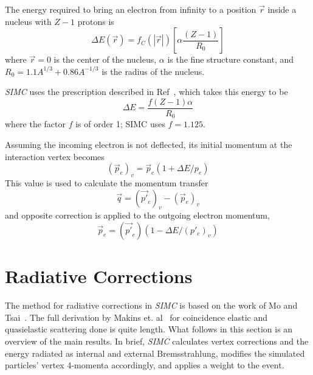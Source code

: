 The energy required to bring an electron from infinity to a position $\vec{r}$
inside a nucleus with $Z-1$ protons is
\begin{equation}
    \Delta E(\vec{r})=f_{C}(|\vec{r}|)\left[\alpha \frac{(Z-1)}{R_{0}}\right]
\end{equation}
where
$\vec{r}=0$ is the center of the nucleus,
$\alpha$ is the fine structure constant,
and
$R_0=1.1 A^{1/3}+0.86 A^{-1/3}$ is the radius of the nucleus.


\textit{SIMC} uses the prescription described in Ref~\cite{Aste_2005}, which
takes this energy to be
\begin{equation}
    \Delta E = \frac{f(Z-1)\alpha}{R_0}
\end{equation}
where the factor $f$ is of order 1; SIMC uses $f=1.125$.


Assuming the incoming electron is not deflected, its initial momentum at the
interaction vertex becomes
\begin{equation}
    (\vec{p}_e)_v = \vec{p}_e(1 + \Delta E / p_e)
\end{equation}
This value is used to calculate the momentum transfer
\begin{equation}
    \vec{q} = (\vec{p'}_e)_v - (\vec{p}_e)_v
\end{equation}
and opposite correction is applied to the outgoing electron momentum,
\begin{equation}
    \vec{p}_e = (\vec{p'}_e)(1 - \Delta E / (p'_e)_v)
\end{equation}




\section{Radiative Corrections}
The method for radiative corrections in \textit{SIMC} is based on the work of
Mo and Tsai~\cite{Mo_1969}.
The full derivation by Makins et. al~\cite{Ent_2001, Makins_1994} for
coincidence elastic and quasielastic scattering done is quite length.
What follows in this section is an overview of the main results.
In brief, \textit{SIMC} calculates vertex corrections and the energy radiated
as internal and external Bremsstrahlung, modifies the simulated particles'
vertex 4-momenta accordingly, and applies a weight to the event.

